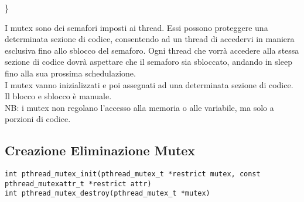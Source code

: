\begin{flushleft}
\begin{flushleft}
{    \}}
  \end{flushleft}
  I mutex sono dei semafori imposti ai thread. Essi possono proteggere una 
  determinata sezione di codice, consentendo ad un thread di accedervi in maniera 
  esclusiva fino allo sblocco del semaforo. Ogni thread che vorrà accedere alla stessa 
  sezione di codice dovrà aspettare che il semaforo sia sbloccato, andando in sleep fino 
  alla sua prossima schedulazione.\\
  I mutex vanno inizializzati e poi assegnati ad una determinata sezione di codice. Il 
  blocco e sblocco è manuale.\\
  NB: i mutex non regolano l’accesso alla memoria o alle variabile, ma solo a porzioni 
  di codice.
  \subsection{Creazione Eliminazione Mutex}
  \begin{flushleft}
    \texttt{int pthread\_mutex\_init(pthread\_mutex\_t *restrict mutex, const pthread\_mutexattr\_t *restrict attr)\\
    int pthread\_mutex\_destroy(pthread\_mutex\_t *mutex)}
  \end{flushleft}

\end{flushleft}
